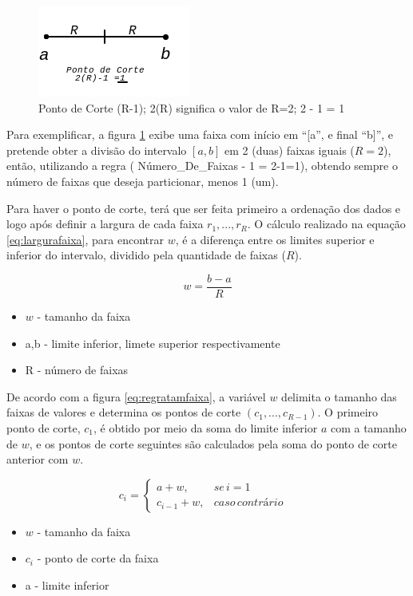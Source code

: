 \begin{figure}[h]
        \centering
        \includegraphics[scale=1]{figs/faixaA-B_PontoCorte.png}
        \caption{Ponto de Corte (R-1); 2(R) significa o valor de R=2; 2 - 1 = 1} \label{fig:pontocorte}
\end{figure}

Para exemplificar, a figura \ref{fig:pontocorte} exibe uma faixa com início em ``[a'', e final ``b]'', e pretende obter a divisão do intervalo ${[a,b]}$ em 2 (duas) faixas iguais (${R=2}$), então, utilizando a regra ( Número\_De\_Faixas - 1 =  2-1=1), obtendo sempre o número de faixas que deseja particionar, menos 1 (um).

Para haver o ponto de corte, terá que ser feita primeiro a ordenação dos dados e logo após definir a largura de cada faixa ${r_1,...,r_R}$. O cálculo realizado na equação \ref{eq:largurafaixa}, para encontrar ${w}$, é a diferença entre os limites superior e inferior do intervalo, dividido pela quantidade de faixas (${R}$).

\begin{equation}
 w = \frac{b-a}{R}
 \label{eq:largurafaixa}
\end{equation}
\begin{itemize}[noitemsep]
 \item ${w}$ - tamanho da faixa
 \item a,b - limite inferior, limete superior respectivamente
 \item R - número de faixas
\end{itemize}

De acordo com a figura \ref{eq:regratamfaixa}, a variável ${w}$ delimita o tamanho das faixas de valores e determina os pontos de corte ${(c_1,...,c_{R-1})}$. O primeiro ponto de corte, ${c_1}$, é obtido por meio da soma do limite inferior ${a}$ com a tamanho de ${w}$, e os pontos de corte seguintes são calculados pela soma do ponto de corte anterior com ${w}$.

\begin{equation}
c_i=\left\{\begin{matrix}
a+w, & se\, i=1 & \\ 
c_{i-1}+w,  & caso\, contrário & 
\end{matrix}\right.
 \label{eq:regratamfaixa}
\end{equation}
\begin{itemize}[noitemsep]
 \item ${w}$ - tamanho da faixa
 \item ${c_i}$ - ponto de corte da faixa
 \item a - limite inferior
\end{itemize}

